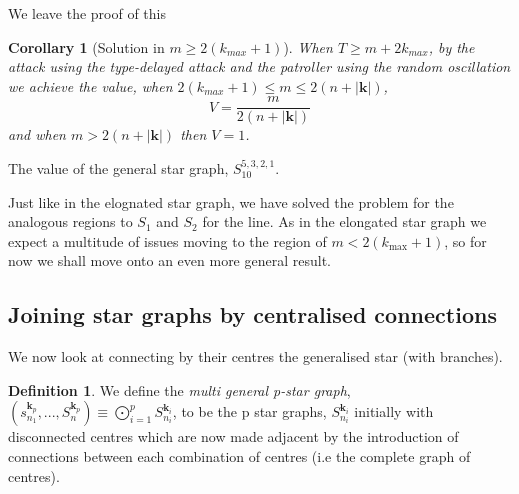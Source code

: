 \documentclass[a4paper,10pt]{article}
\newtheorem{corollary}[theorem]{Corollary}
\theoremstyle{definition}
\newtheorem{definition}[theorem]{Definition}
\theoremstyle{definition}
\theoremstyle{remark}
\theoremstyle{definition}
\begin{document}
We leave the proof of this

\begin{corollary}[Solution in $m \geq 2(k_{max}+1)$]
When $T \geq m+2k_{max}$, by the attack using the type-delayed attack and the patroller using the random oscillation we achieve the value, when $2(k_{max}+1) \leq m \leq 2(n+|\bm{k}|)$,
$$V= \frac{m}{2(n+|\bm{k}|)} $$
and when $m > 2(n+|\bm{k}|)$ then $V=1$.
\end{corollary}

\begin{myfigure}
\begin{center}

\end{center}
\caption{The value of the general star graph, $S_{10}^{5,3,2,1}$.}
\end{myfigure}

Just like in the elognated star graph, we have solved the problem for the analogous regions to $S_{1}$ and $S_{2}$ for the line. As in the elongated star graph we expect a multitude of issues moving to the region of $m < 2(k_{\max}+1)$, so for now we shall move onto an even more general result.

\subsection{Joining star graphs by centralised connections}

We now look at connecting by their centres the generalised star (with branches).

\begin{definition}
We define the \textit{multi general p-star graph}, $(s_{n_{1}}^{\bm{k}_{p}},...,S_{n_{}}^{\bm{k}_{p}}) \equiv \bigodot\limits_{i=1}^{p} S_{n_{i}}^{\bm{k}_{i}}$, to be the p star graphs, $S_{n_{i}}^{\bm{k}_{i}}$ initially with disconnected centres which are now made adjacent by the introduction of connections between each combination of centres (i.e the complete graph of centres).
\end{definition}
\end{document}
